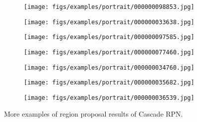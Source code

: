 \documentclass{article}
\begin{document}
\begin{figure*}[t]
		\vspace{0.09cm}
		\begin{subfigure}{0.1375\textwidth}
			\centering
			\texttt{[image: figs/examples/portrait/000000098853.jpg]}
		\end{subfigure}
		\begin{subfigure}{0.1375\textwidth}
			\centering
			\texttt{[image: figs/examples/portrait/000000033638.jpg]}
		\end{subfigure}
		\begin{subfigure}{0.1375\textwidth}
			\centering
			\texttt{[image: figs/examples/portrait/000000097585.jpg]}
		\end{subfigure}
		\begin{subfigure}{0.1375\textwidth}
			\centering
			\texttt{[image: figs/examples/portrait/000000077460.jpg]}
		\end{subfigure}
		\begin{subfigure}{0.1375\textwidth}
			\centering
			\texttt{[image: figs/examples/portrait/000000034760.jpg]}
		\end{subfigure}
		\begin{subfigure}{0.1375\textwidth}
			\centering
			\texttt{[image: figs/examples/portrait/000000035682.jpg]}
		\end{subfigure}
		\begin{subfigure}{0.1375\textwidth}
			\centering
			\texttt{[image: figs/examples/portrait/000000036539.jpg]}
		\end{subfigure}
		\caption{More examples of region proposal results of Cascade RPN.}
		\label{fig:more_examples}
	\end{figure*}
	
\end{document}
